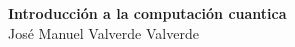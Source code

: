 \documentclass[12pt]{article}
\begin{document}
\onehalfspacing

\begin{titlepage}
    \centering
    \vspace*{5cm} %
    {\LARGE \textbf{Introducción a la computación cuantica}}\\[1cm]
    {José Manuel Valverde Valverde} %
    \vfill
\end{titlepage}


\end{document}
